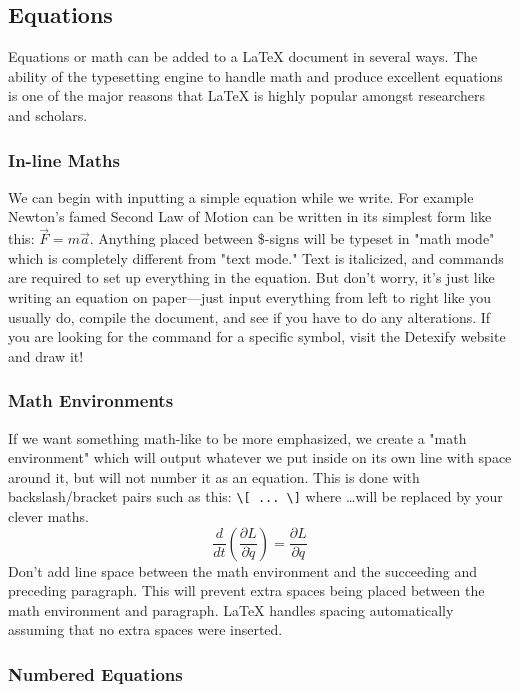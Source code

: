 \subsection{Equations}\label{sec.equations}

Equations or math can be added to a \LaTeX{} document in several ways. The ability of the typesetting engine to handle math and produce excellent equations is one of the major reasons that \LaTeX{} is highly popular amongst researchers and scholars.

\subsubsection{In-line Maths}\label{sec.inlinemaths}

We can begin with inputting a simple equation while we write. For example Newton's famed Second Law of Motion can be written in its simplest form like this: $\vec{F}=m\vec{a}$. Anything placed between \$-signs will be typeset in "math mode" which is completely different from "text mode." Text is italicized, and commands are required to set up everything in the equation. But don't worry, it's just like writing an equation on paper---just input everything from left to right like you usually do, compile the document, and see if you have to do any alterations. If you are looking for the command for a specific symbol, visit the Detexify website and draw it!~\cite{web.detexify}

\subsubsection{Math Environments}\label{sec.mathenvironments}

If we want something math-like to be more emphasized, we create a "math environment" which will output whatever we put inside on its own line with space around it, but will not number it as an equation. This is done with backslash/bracket pairs such as this: \verb|\[ ... \]| where \dots will be replaced by your clever maths. 
\[\frac{d}{dt}\left(\frac{\partial L}{\partial\dot{q}}\right)=\frac{\partial L}{\partial q}\]
Don't add line space between the math environment and the succeeding and preceding paragraph. This will prevent extra spaces being placed between the math environment and paragraph. \LaTeX{} handles spacing automatically assuming that no extra spaces were inserted.

\subsubsection{Numbered Equations}\label{sec.numberedequations}

